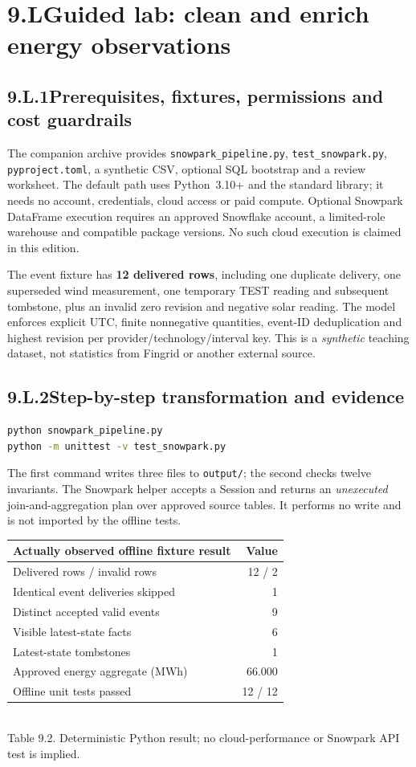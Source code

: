 \documentclass[11pt,twoside]{article}
\newcommand{\topic}[2]{\subsection*{#1\quad #2}}
\begin{document}
\section*{9.L\quad Guided lab: clean and enrich energy observations}
\topic{9.L.1}{Prerequisites, fixtures, permissions and cost guardrails}
The companion archive provides \texttt{snowpark\_pipeline.py}, \texttt{test\_snowpark.py}, \texttt{pyproject.toml}, a synthetic CSV, optional SQL bootstrap and a review worksheet. The default path uses Python~3.10+ and the standard library; it needs no account, credentials, cloud access or paid compute. Optional Snowpark DataFrame execution requires an approved Snowflake account, a limited-role warehouse and compatible package versions. No such cloud execution is claimed in this edition.

The event fixture has \textbf{12 delivered rows}, including one duplicate delivery, one superseded wind measurement, one temporary TEST reading and subsequent tombstone, plus an invalid zero revision and negative solar reading. The model enforces explicit UTC, finite nonnegative quantities, event-ID deduplication and highest revision per provider/technology/interval key. This is a \emph{synthetic} teaching dataset, not statistics from Fingrid or another external source.
\topic{9.L.2}{Step-by-step transformation and evidence}
\begin{lstlisting}[language=bash,caption={Default reproducible steps from the lab directory.}]
python snowpark_pipeline.py
python -m unittest -v test_snowpark.py
\end{lstlisting}
The first command writes three files to \texttt{output/}; the second checks twelve invariants. The Snowpark helper accepts a Session and returns an \emph{unexecuted} join-and-aggregation plan over approved source tables. It performs no write and is not imported by the offline tests.
\begin{center}\renewcommand{\arraystretch}{1.1}\begin{tabularx}{\linewidth}{@{}Xr@{}}\toprule
\textbf{Actually observed offline fixture result}&\textbf{Value}\\\midrule
Delivered rows / invalid rows&12 / 2\\
Identical event deliveries skipped&1\\
Distinct accepted valid events&9\\
Visible latest-state facts&6\\
Latest-state tombstones&1\\
Approved energy aggregate (MWh)&66.000\\
Offline unit tests passed&12 / 12\\\bottomrule
\end{tabularx}\\{\fontsize{8}{9.5}\selectfont\color{inkgray}Table 9.2. Deterministic Python result; no cloud-performance or Snowpark API test is implied.}\end{center}
\end{document}
